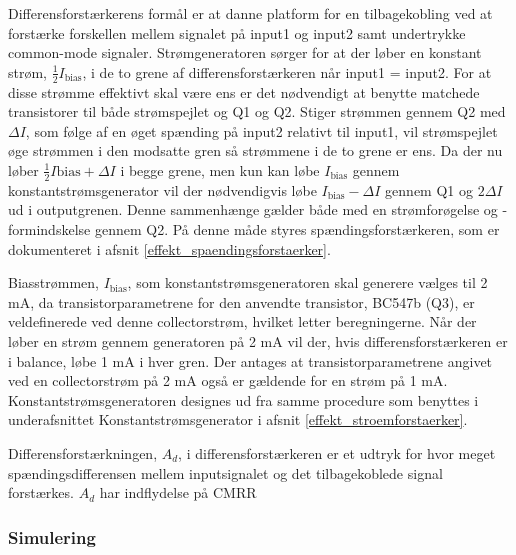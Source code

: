 Differensforstærkerens formål er at danne platform for en tilbagekobling ved at forstærke forskellen mellem signalet på input1 og input2 samt undertrykke common-mode signaler. Strømgeneratoren sørger for at der løber en konstant strøm, $\frac{1}{2}I_\mathrm{bias}$, i de to grene af differensforstærkeren når input1 = input2. For at disse strømme effektivt skal være ens er det nødvendigt at benytte matchede transistorer til både strømspejlet og Q1 og Q2. Stiger strømmen gennem Q2 med $\Delta I$, som følge af en øget spænding på input2 relativt til input1, vil strømspejlet øge strømmen i den modsatte gren så strømmene i de to grene er ens. Da der nu løber $\frac{1}{2}I\mathrm{bias} + \Delta I$ i begge grene, men kun kan løbe $I_\mathrm{bias}$ gennem konstantstrømsgenerator vil der nødvendigvis løbe $I_\mathrm{bias} -\Delta I$ gennem Q1 og $2\Delta I$ ud i outputgrenen. Denne sammenhænge gælder både med en strømforøgelse og -formindskelse gennem Q2. På denne måde styres spændingsforstærkeren, som er dokumenteret i afsnit \ref{effekt_spaendingsforstaerker}. 

Biasstrømmen, $I_\mathrm{bias}$, som konstantstrømsgeneratoren skal generere vælges til 2 mA, da transistorparametrene for den anvendte transistor, BC547b (Q3), er veldefinerede ved denne collectorstrøm, hvilket letter beregningerne. Når der løber en strøm gennem generatoren på 2 mA vil der, hvis differensforstærkeren er i balance, løbe 1 mA i hver gren. Der antages at transistorparametrene angivet ved en collectorstrøm på 2 mA også er gældende for en strøm på 1 mA. 
Konstantstrømsgeneratoren designes ud fra samme procedure som benyttes i underafsnittet Konstantstrømsgenerator i afsnit \ref{effekt_stroemforstaerker}. 


Differensforstærkningen, $A_d$, i differensforstærkeren er et udtryk for hvor meget spændingsdifferensen mellem inputsignalet og det tilbagekoblede signal forstærkes. $A_d$ har indflydelse på CMRR 


\subsubsection*{Simulering}